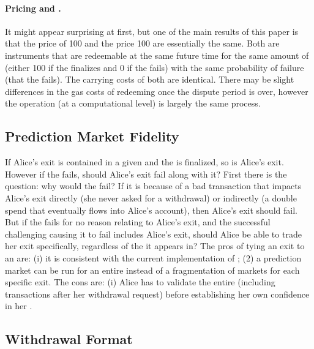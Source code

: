 \paragraph{Pricing \final and \fail.}

It might appear surprising at first, but one of the main results of this paper is that the price of 100 \ethxx and the price 100 \fail are essentially the same. Both are instruments that are redeemable at the same future time for the same amount of \ethone (either 100 if the \rblock finalizes and 0 if the \rblock fails) with the same probability of failure (that the \rblock fails). The carrying costs of both are identical. There may be slight differences in the gas costs of redeeming \ethone once the dispute period is over, however the operation (at a computational level) is largely the same process. 


\subsection{Prediction Market Fidelity}
\label{sec:fidelity}


If Alice's exit is contained in a given \rblock and the \rblock is finalized, so is Alice's exit. However if the \rblock fails, should Alice's exit fail along with it? First there is the question: why would the \rblock fail? If it is because of a bad transaction that impacts Alice's exit directly (\eg she never asked for a withdrawal) or indirectly (\eg a double spend that eventually flows into Alice's account), then Alice's exit should fail. But if the \rblock fails for no reason relating to Alice's exit, and the successful challenging \rblock causing it to fail includes Alice's exit, should Alice be able to trade her exit specifically, regardless of the \rblock it appears in? The pros of tying an exit to an \rblock are: (i) it is consistent with the current implementation of \arb; (2) a prediction market can be run for an entire \rblock instead of a fragmentation of markets for each specific exit. The cons are: (i) Alice has to validate the entire \rblock (including transactions after her withdrawal request) before establishing her own confidence in her \ethxx. 

\subsection{Withdrawal Format}

